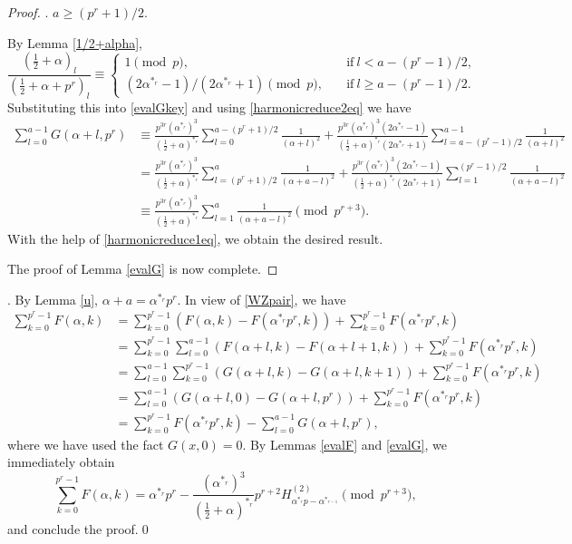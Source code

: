 \documentclass[12pt,reqno]{amsart}
\def\t{\text}
\def\f{\frac}
\def\eq{\equiv}
\theoremstyle{plain}
\theoremstyle{definition}
\theoremstyle{remark}
\numberwithin{equation}{section}
\begin{document}
\begin{proof}
\medskip

. $a\geq(p^r+1)/2$. 

\medskip

By Lemma \ref{1/2+alpha},
$$
\f{(\f12+\alpha)_l}{(\f12+\alpha+p^r)_l}\eq\begin{cases}1\pmod{p},\quad&\t{if}\ l<a-(p^r-1)/2,\\ (2\alpha^{\ast_r}-1)/(2\alpha^{\ast_r}+1)\pmod{p},\quad&\t{if}\ l\geq a-(p^r-1)/2.\end{cases}
$$
Substituting this into \eqref{evalGkey} and using \eqref{harmonicreduce2eq} we have
\begin{align*}
\sum_{l=0}^{a-1}G(\alpha+l,p^r)&\eq \f{p^{3r}(\alpha^{\ast_r})^3}{(\f12+\alpha)^{\ast_r}}\sum_{l=0}^{a-(p^r+1)/2}\f{1}{(\alpha+l)^2}+\f{p^{3r}(\alpha^{\ast_r})^3(2\alpha^{\ast_r}-1)}{(\f12+\alpha)^{\ast_r}(2\alpha^{\ast_r}+1)}\sum_{l=a-(p^r-1)/2}^{a-1}\f{1}{(\alpha+l)^2}\\
&=\f{p^{3r}(\alpha^{\ast_r})^3}{(\f12+\alpha)^{\ast_r}}\sum_{l=(p^r+1)/2}^{a}\f{1}{(\alpha+a-l)^2}+\f{p^{3r}(\alpha^{\ast_r})^3(2\alpha^{\ast_r}-1)}{(\f12+\alpha)^{\ast_r}(2\alpha^{\ast_r}+1)}\sum_{l=1}^{(p^r-1)/2}\f{1}{(\alpha+a-l)^2}\\
&\eq \f{p^{3r}(\alpha^{\ast_r})^3}{(\f12+\alpha)^{\ast_r}}\sum_{l=1}^{a}\f{1}{(\alpha+a-l)^2}\pmod{p^{r+3}}.
\end{align*}
With the help of \eqref{harmonicreduce1eq}, we obtain the desired result.

The proof of Lemma \ref{evalG} is now complete.
\end{proof}

\medskip

. By Lemma \ref{u}, $\alpha+a=\alpha^{\ast_r}p^r$. In view of \eqref{WZpair}, we have
\begin{align*}
\sum_{k=0}^{p^r-1}F(\alpha,k)&=\sum_{k=0}^{p^r-1}(F(\alpha,k)-F(\alpha^{\ast_r}p^r,k))+\sum_{k=0}^{p^r-1}F(\alpha^{\ast_r}p^r,k)\\
&=\sum_{k=0}^{p^r-1}\sum_{l=0}^{a-1}(F(\alpha+l,k)-F(\alpha+l+1,k))+\sum_{k=0}^{p^r-1}F(\alpha^{\ast_r}p^r,k)\\
&=\sum_{l=0}^{a-1}\sum_{k=0}^{p^r-1}(G(\alpha+l,k)-G(\alpha+l,k+1))+\sum_{k=0}^{p^r-1}F(\alpha^{\ast_r}p^r,k)\\
&=\sum_{l=0}^{a-1}(G(\alpha+l,0)-G(\alpha+l,p^r))+\sum_{k=0}^{p^r-1}F(\alpha^{\ast_r}p^r,k)\\
&=\sum_{k=0}^{p^r-1}F(\alpha^{\ast_r}p^r,k)-\sum_{l=0}^{a-1}G(\alpha+l,p^r),
\end{align*}
where we have used the fact $G(x,0)=0$. By Lemmas \ref{evalF} and \ref{evalG}, we immediately obtain
$$
\sum_{k=0}^{p^r-1}F(\alpha,k)=\alpha^{\ast_r}p^r -\f{(\alpha^{\ast_r})^3}{(\f12+\alpha)^{\ast_r}}p^{r+2}H_{\alpha^{\ast_r}p-\alpha^{\ast_{r-1}}}^{(2)}\pmod{p^{r+3}},
$$
and conclude the proof.\qed
\end{document}

